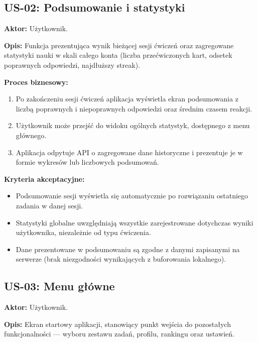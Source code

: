 \documentclass[polish]{aghengthesis}
\begin{document}

\subsection{US-02: Podsumowanie i statystyki}
\textbf{Aktor:} Użytkownik.

\textbf{Opis:} Funkcja prezentująca wynik bieżącej sesji ćwiczeń oraz
zagregowane statystyki nauki w skali całego konta (liczba przećwiczonych
kart, odsetek poprawnych odpowiedzi, najdłuższy streak).

\textbf{Proces biznesowy:}
\begin{enumerate}
    \item Po zakończeniu sesji ćwiczeń aplikacja wyświetla ekran
    podsumowania z liczbą poprawnych i niepoprawnych odpowiedzi oraz
    średnim czasem reakcji.
    \item Użytkownik może przejść do widoku ogólnych statystyk, dostępnego
    z menu głównego.
    \item Aplikacja odpytuje API o zagregowane dane historyczne i prezentuje
    je w formie wykresów lub liczbowych podsumowań.
\end{enumerate}

\textbf{Kryteria akceptacyjne:}
\begin{itemize}
    \item Podsumowanie sesji wyświetla się automatycznie po rozwiązaniu
    ostatniego zadania w danej sesji.
    \item Statystyki globalne uwzględniają wszystkie zarejestrowane dotychczas
    wyniki użytkownika, niezależnie od typu ćwiczenia.
    \item Dane prezentowane w podsumowaniu są zgodne z danymi zapisanymi na
    serwerze (brak niezgodności wynikających z buforowania lokalnego).
\end{itemize}

\subsection{US-03: Menu główne}
\textbf{Aktor:} Użytkownik.

\textbf{Opis:} Ekran startowy aplikacji, stanowiący punkt wejścia do
pozostałych funkcjonalności — wyboru zestawu zadań, profilu, rankingu oraz
ustawień.
\end{document}
